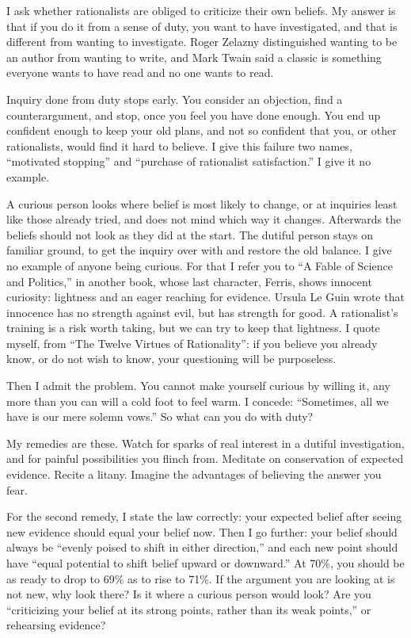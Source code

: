 
I ask whether rationalists are obliged to criticize their own beliefs. My answer is that if you do it from a sense of duty, you want to have investigated, and that is different from wanting to investigate. Roger Zelazny distinguished wanting to be an author from wanting to write, and Mark Twain said a classic is something everyone wants to have read and no one wants to read.

Inquiry done from duty stops early. You consider an objection, find a counterargument, and stop, once you feel you have done enough. You end up confident enough to keep your old plans, and not so confident that you, or other rationalists, would find it hard to believe. I give this failure two names, ``motivated stopping'' and ``purchase of rationalist satisfaction.'' I give it no example.

A curious person looks where belief is most likely to change, or at inquiries least like those already tried, and does not mind which way it changes. Afterwards the beliefs should not look as they did at the start. The dutiful person stays on familiar ground, to get the inquiry over with and restore the old balance. I give no example of anyone being curious. For that I refer you to ``A Fable of Science and Politics,'' in another book, whose last character, Ferris, shows innocent curiosity: lightness and an eager reaching for evidence. Ursula Le Guin wrote that innocence has no strength against evil, but has strength for good. A rationalist's training is a risk worth taking, but we can try to keep that lightness. I quote myself, from ``The Twelve Virtues of Rationality'': if you believe you already know, or do not wish to know, your questioning will be purposeless.

Then I admit the problem. You cannot make yourself curious by willing it, any more than you can will a cold foot to feel warm. I concede: ``Sometimes, all we have is our mere solemn vows.'' So what can you do with duty?

My remedies are these. Watch for sparks of real interest in a dutiful investigation, and for painful possibilities you flinch from. Meditate on conservation of expected evidence. Recite a litany. Imagine the advantages of believing the answer you fear.

For the second remedy, I state the law correctly: your expected belief after seeing new evidence should equal your belief now. Then I go further: your belief should always be ``evenly poised to shift in either direction,'' and each new point should have ``equal potential to shift belief upward or downward.'' At 70\%, you should be as ready to drop to 69\% as to rise to 71\%.  If the argument you are looking at is not new, why look there? Is it where a curious person would look? Are you ``criticizing your belief at its strong points, rather than its weak points,'' or rehearsing evidence?


